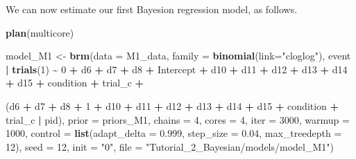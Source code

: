 \documentclass[
  man,floatsintext]{apa6}
\newenvironment{Shaded}{\begin{snugshade}}{\end{snugshade}}
\newcommand{\AttributeTok}[1]{\textcolor[rgb]{0.13,0.29,0.53}{#1}}
\newcommand{\DecValTok}[1]{\textcolor[rgb]{0.00,0.00,0.81}{#1}}
\newcommand{\FloatTok}[1]{\textcolor[rgb]{0.00,0.00,0.81}{#1}}
\newcommand{\FunctionTok}[1]{\textcolor[rgb]{0.13,0.29,0.53}{\textbf{#1}}}
\newcommand{\NormalTok}[1]{#1}
\newcommand{\OtherTok}[1]{\textcolor[rgb]{0.56,0.35,0.01}{#1}}
\newcommand{\SpecialCharTok}[1]{\textcolor[rgb]{0.81,0.36,0.00}{\textbf{#1}}}
\newcommand{\StringTok}[1]{\textcolor[rgb]{0.31,0.60,0.02}{#1}}
\begin{document}
\normalsize

We can now estimate our first Bayesion regression model, as follows.

\scriptsize

\begin{Shaded}
\begin{Highlighting}[]
\FunctionTok{plan}\NormalTok{(multicore)}

\NormalTok{model\_M1 }\OtherTok{\textless{}{-}}
   \FunctionTok{brm}\NormalTok{(}\AttributeTok{data =}\NormalTok{ M1\_data,}
       \AttributeTok{family =} \FunctionTok{binomial}\NormalTok{(}\AttributeTok{link=}\StringTok{"cloglog"}\NormalTok{),}
\NormalTok{       event }\SpecialCharTok{|} \FunctionTok{trials}\NormalTok{(}\DecValTok{1}\NormalTok{) }\SpecialCharTok{\textasciitilde{}} \DecValTok{0} \SpecialCharTok{+}\NormalTok{ d6 }\SpecialCharTok{+}\NormalTok{ d7 }\SpecialCharTok{+}\NormalTok{ d8 }\SpecialCharTok{+}\NormalTok{ Intercept }\SpecialCharTok{+}\NormalTok{ d10 }\SpecialCharTok{+}\NormalTok{ d11 }\SpecialCharTok{+}\NormalTok{ d12 }\SpecialCharTok{+}\NormalTok{ d13 }\SpecialCharTok{+}\NormalTok{ d14 }\SpecialCharTok{+}\NormalTok{ d15 }\SpecialCharTok{+} 
\NormalTok{         condition }\SpecialCharTok{+}\NormalTok{ trial\_c }\SpecialCharTok{+}
       
\NormalTok{                   (d6 }\SpecialCharTok{+}\NormalTok{ d7 }\SpecialCharTok{+}\NormalTok{ d8 }\SpecialCharTok{+} \DecValTok{1} \SpecialCharTok{+}\NormalTok{ d10 }\SpecialCharTok{+}\NormalTok{ d11 }\SpecialCharTok{+}\NormalTok{ d12 }\SpecialCharTok{+}\NormalTok{ d13 }\SpecialCharTok{+}\NormalTok{ d14 }\SpecialCharTok{+}\NormalTok{ d15 }\SpecialCharTok{+}\NormalTok{ condition }\SpecialCharTok{+}\NormalTok{ trial\_c }\SpecialCharTok{|}\NormalTok{ pid),}
       \AttributeTok{prior =}\NormalTok{ priors\_M1,}
       \AttributeTok{chains =} \DecValTok{4}\NormalTok{, }\AttributeTok{cores =} \DecValTok{4}\NormalTok{, }\AttributeTok{iter =} \DecValTok{3000}\NormalTok{, }\AttributeTok{warmup =} \DecValTok{1000}\NormalTok{,}
       \AttributeTok{control =} \FunctionTok{list}\NormalTok{(}\AttributeTok{adapt\_delta =} \FloatTok{0.999}\NormalTok{, }\AttributeTok{step\_size =} \FloatTok{0.04}\NormalTok{, }\AttributeTok{max\_treedepth =} \DecValTok{12}\NormalTok{),}
       \AttributeTok{seed =} \DecValTok{12}\NormalTok{, }\AttributeTok{init =} \StringTok{"0"}\NormalTok{,}
       \AttributeTok{file =} \StringTok{"Tutorial\_2\_Bayesian/models/model\_M1"}\NormalTok{)}
\end{Highlighting}
\end{Shaded}
\end{document}
